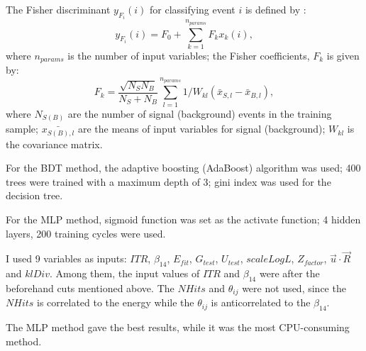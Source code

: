 The Fisher discriminant $y_{F_i}(i)$ for classifying event $i$ is defined by \cite{tmvaWebsite}:
\begin{equation}
y_{F_i}(i) = F_0+\sum_{k=1}^{n_{params}}F_k x_k(i),
\end{equation}
where $n_{params}$ is the number of input variables; the Fisher coefficients, $F_k$ is given by:
\begin{equation}
F_k = \frac{\sqrt{N_SN_B}}{N_S+N_B}\sum_{l=1}^{n_{params}}1/W_{kl}(\bar{x}_{S,l}-\bar{x}_{B,l}),
\end{equation} 
where $N_{S(B)}$ are the number of signal (background) events in the training sample; $\bar{x_{S(B),l}}$ are the means of input variables for signal (background); $W_{kl}$ is the covariance matrix\cite{tmvaWebsite}.

For the BDT method, the adaptive boosting (AdaBoost) algorithm was used; 400 trees were trained with a maximum depth of 3; gini index was used for the decision tree.

For the MLP method, sigmoid function was set as the activate function; 4 hidden layers, 200 training cycles were used.

I used 9 variables as inputs: $ITR$, $\beta_{14}$, $E_{fit}$, $G_{test}$, $U_{test}$, $scaleLogL$, $Z_{factor}$, $\vec{u}\cdot \vec{R}$ and $klDiv$. Among them, the input values of $ITR$ and $\beta_{14}$ were after the beforehand cuts mentioned above. The $NHits$ and $\theta_{ij}$ were not used, since the $NHits$ is correlated to the energy while the $\theta_{ij}$ is anticorrelated to the $\beta_{14}$.

The MLP method gave the best results, while it was the most CPU-consuming method.

